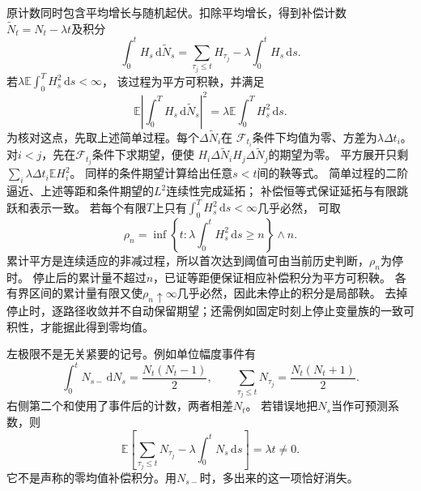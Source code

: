 原计数同时包含平均增长与随机起伏。扣除平均增长，得到补偿计数
$\widetilde N_t=N_t-\lambda t$及积分
\begin{equation}
  \int_0^t H_s\,\mathrm d\widetilde N_s
    =\sum_{\tau_j\leq t}H_{\tau_j}
      -\lambda\int_0^t H_s\,\mathrm ds.
  \label{eq:action-state-compensated-poisson}
\end{equation}
若$\lambda\mathbb E\int_0^T H_s^2\,\mathrm ds<\infty$，
该过程为平方可积鞅，并满足
\begin{equation}
  \mathbb E\left|\int_0^T H_s\,\mathrm d\widetilde N_s\right|^2
       =\lambda\mathbb E\int_0^T H_s^2\,\mathrm ds.
  \label{eq:action-state-poisson-isometry}
\end{equation}
为核对这点，先取上述简单过程。每个$\Delta\widetilde N_i$在
$\mathcal F_{t_i}$条件下均值为零、方差为$\lambda\Delta t_i$。
对$i<j$，先在$\mathcal F_{t_j}$条件下求期望，便使
$H_i\Delta\widetilde N_iH_j\Delta\widetilde N_j$的期望为零。
平方展开只剩$\sum_i\lambda\Delta t_i\mathbb E H_i^2$。
同样的条件期望计算给出任意$s<t$间的鞅等式。
简单过程的二阶逼近、上述等距和条件期望的$L^2$连续性完成延拓；
补偿恒等式保证延拓与有限跳跃和表示一致。
若每个有限$T$上只有$\int_0^T H_s^2\,\mathrm ds<\infty$几乎必然，
可取
\[
 \rho_n=\inf\left\{t:\lambda\int_0^tH_s^2\,\mathrm ds\geq n\right\}\wedge n.
\]
累计平方是连续适应的非减过程，所以首次达到阈值可由当前历史判断，$\rho_n$为停时。
停止后的累计量不超过$n$，已证等距便保证相应补偿积分为平方可积鞅。
各有界区间的累计量有限又使$\rho_n\uparrow\infty$几乎必然，因此未停止的积分是局部鞅。
去掉停止时，逐路径收敛并不自动保留期望；还需例如固定时刻上停止变量族的一致可积性，才能据此得到零均值。

左极限不是无关紧要的记号。例如单位幅度事件有
\[
  \int_0^t N_{s-}\,\mathrm dN_s=\frac{N_t(N_t-1)}2,\qquad
  \sum_{\tau_j\leq t}N_{\tau_j}=\frac{N_t(N_t+1)}2.
\]
右侧第二个和使用了事件后的计数，两者相差$N_t$。
若错误地把$N_s$当作可预测系数，则
\[
  \mathbb E\left[\sum_{\tau_j\leq t}N_{\tau_j}
       -\lambda\int_0^t N_s\,\mathrm ds\right]=\lambda t\neq0.
\]
它不是声称的零均值补偿积分。用$N_{s-}$时，多出来的这一项恰好消失。

